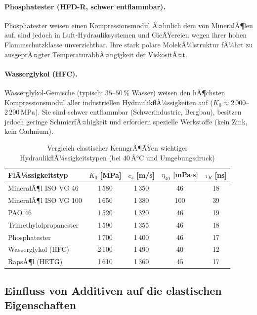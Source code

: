﻿\documentclass[a4paper,12pt]{scrreprt}
\theoremstyle{definition}
\begin{document}
\paragraph{Phosphatester (HFD-R, schwer entflammbar).}
Phosphatester weisen einen Kompressionsmodul Ã¤hnlich dem von MineralÃ¶len
auf, sind jedoch in Luft-Hydrauliksystemen und GieÃŸereien wegen ihrer
hohen Flammschutzklasse unverzichtbar. Ihre stark polare MolekÃ¼lstruktur
fÃ¼hrt zu ausgeprÃ¤gter TemperaturabhÃ¤ngigkeit der ViskositÃ¤t.

\paragraph{Wasserglykol (HFC).}
Wasserglykol-Gemische (typisch: $35$--$50\,\%$ Wasser) weisen den
hÃ¶chsten Kompressionsmodul aller industriellen HydraulikflÃ¼ssigkeiten
auf ($K_0 \approx 2\,000$--$2\,200\,\mathrm{MPa}$). Sie sind schwer
entflammbar (Schwerindustrie, Bergbau), besitzen jedoch geringe
SchmierfÃ¤higkeit und erfordern spezielle Werkstoffe (kein Zink, kein
Cadmium).

\begin{table}[H]
  \centering
  \caption{Vergleich elastischer KenngrÃ¶ÃŸen wichtiger HydraulikflÃ¼ssigkeitstypen
    (bei $40\,Â°\mathrm{C}$ und Umgebungsdruck)}
  \label{tab:fluid_vergleich}
  \begin{tabular}{lcccc}
    \toprule
    FlÃ¼ssigkeitstyp
      & $K_0$ [MPa]
      & $c_s$ [m/s]
      & $\eta_{40}$ [mPa$\cdot$s]
      & $\tau_R$ [ns] \\
    \midrule
    MineralÃ¶l ISO VG 46    & 1\,580 & 1\,350 & 46  & 18 \\
    MineralÃ¶l ISO VG 100   & 1\,650 & 1\,380 & 100 & 39 \\
    PAO 46                 & 1\,520 & 1\,320 & 46  & 19 \\
    Trimethylolpropanester & 1\,590 & 1\,355 & 46  & 18 \\
    Phosphatester          & 1\,700 & 1\,400 & 46  & 17 \\
    Wasserglykol (HFC)     & 2\,100 & 1\,490 & 40  & 12 \\
    RapsÃ¶l (HETG)          & 1\,610 & 1\,360 & 45  & 17 \\
    \bottomrule
  \end{tabular}
\end{table}

\subsection{Einfluss von Additiven auf die elastischen Eigenschaften}
\end{document}
